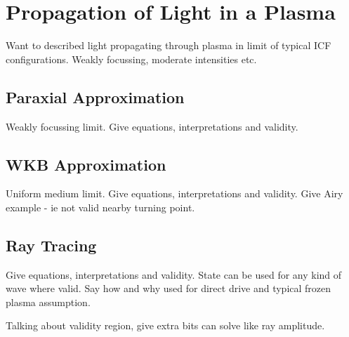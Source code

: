 \section{Propagation of Light in a Plasma}%
\label{sec:theory_propagation}

Want to described light propagating through plasma in limit of typical ICF configurations.
Weakly focussing, moderate intensities etc.


\subsection{Paraxial Approximation}%
\label{sec:theory_paraxial}

Weakly focussing limit.
Give equations, interpretations and validity.

\subsection{WKB Approximation}%
\label{sec:theory_WKB}

Uniform medium limit.
Give equations, interpretations and validity.
Give Airy example - ie not valid nearby turning point.

\subsection{Ray Tracing}%
\label{sec:theory_rays}

Give equations, interpretations and validity.
State can be used for any kind of wave where valid.
Say how and why used for direct drive and typical frozen plasma assumption.

Talking about validity region, give extra bits can solve like ray amplitude.


